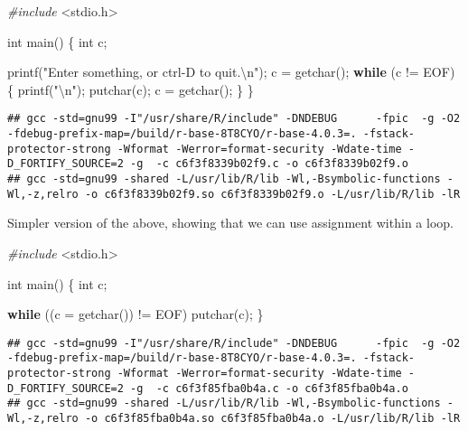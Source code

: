 \documentclass[
]{book}
\newenvironment{Shaded}{\begin{snugshade}}{\end{snugshade}}
\newcommand{\ControlFlowTok}[1]{\textcolor[rgb]{0.13,0.29,0.53}{\textbf{#1}}}
\newcommand{\DataTypeTok}[1]{\textcolor[rgb]{0.13,0.29,0.53}{#1}}
\newcommand{\ImportTok}[1]{#1}
\newcommand{\NormalTok}[1]{#1}
\newcommand{\PreprocessorTok}[1]{\textcolor[rgb]{0.56,0.35,0.01}{\textit{#1}}}
\newcommand{\SpecialCharTok}[1]{\textcolor[rgb]{0.00,0.00,0.00}{#1}}
\newcommand{\StringTok}[1]{\textcolor[rgb]{0.31,0.60,0.02}{#1}}
\begin{document}
\begin{Shaded}
\begin{Highlighting}[]
\PreprocessorTok{\#include }\ImportTok{\textless{}stdio.h\textgreater{}}

\DataTypeTok{int}\NormalTok{ main()}
\NormalTok{\{}
    \DataTypeTok{int}\NormalTok{ c;}

\NormalTok{    printf(}\StringTok{"Enter something, or ctrl{-}D to quit.}\SpecialCharTok{\textbackslash{}n}\StringTok{"}\NormalTok{);}
\NormalTok{    c = getchar();}
    \ControlFlowTok{while}\NormalTok{ (c != EOF) \{}
\NormalTok{        printf(}\StringTok{"}\SpecialCharTok{\textbackslash{}n}\StringTok{"}\NormalTok{);}
\NormalTok{        putchar(c);}
\NormalTok{        c = getchar();}
\NormalTok{    \}}
\NormalTok{\}}
\end{Highlighting}
\end{Shaded}

\begin{verbatim}
## gcc -std=gnu99 -I"/usr/share/R/include" -DNDEBUG      -fpic  -g -O2 -fdebug-prefix-map=/build/r-base-8T8CYO/r-base-4.0.3=. -fstack-protector-strong -Wformat -Werror=format-security -Wdate-time -D_FORTIFY_SOURCE=2 -g  -c c6f3f8339b02f9.c -o c6f3f8339b02f9.o
## gcc -std=gnu99 -shared -L/usr/lib/R/lib -Wl,-Bsymbolic-functions -Wl,-z,relro -o c6f3f8339b02f9.so c6f3f8339b02f9.o -L/usr/lib/R/lib -lR
\end{verbatim}

Simpler version of the above, showing that we can use assignment within a loop.

\begin{Shaded}
\begin{Highlighting}[]
\PreprocessorTok{\#include }\ImportTok{\textless{}stdio.h\textgreater{}}

\DataTypeTok{int}\NormalTok{ main()}
\NormalTok{\{}
    \DataTypeTok{int}\NormalTok{ c;}
    
    \ControlFlowTok{while}\NormalTok{ ((c = getchar()) != EOF) }
\NormalTok{        putchar(c);}
\NormalTok{\}}
\end{Highlighting}
\end{Shaded}

\begin{verbatim}
## gcc -std=gnu99 -I"/usr/share/R/include" -DNDEBUG      -fpic  -g -O2 -fdebug-prefix-map=/build/r-base-8T8CYO/r-base-4.0.3=. -fstack-protector-strong -Wformat -Werror=format-security -Wdate-time -D_FORTIFY_SOURCE=2 -g  -c c6f3f85fba0b4a.c -o c6f3f85fba0b4a.o
## gcc -std=gnu99 -shared -L/usr/lib/R/lib -Wl,-Bsymbolic-functions -Wl,-z,relro -o c6f3f85fba0b4a.so c6f3f85fba0b4a.o -L/usr/lib/R/lib -lR
\end{verbatim}
\end{document}
